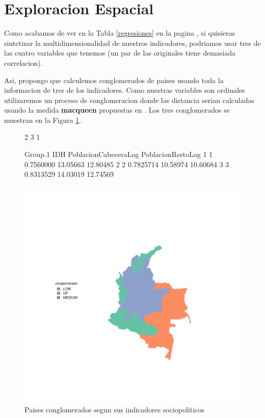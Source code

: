 \documentclass{article}
\begin{document}
\clearpage


\section{Exploracion Espacial}

Como acabamos de ver en la Tabla \ref{regresiones} en la pagina \pageref{regresiones}, si quisieras sintetizar la multidimensionalidad de nuestros indicadores, podriamos usar tres de las cuatro variables que tenemos (un par de las originales tiene demasiada correlacion). 

Asi, propongo que calculemos conglomerados de paises usando toda la informacion de tres de los indicadores. Como nuestras variables son ordinales utilizaremos un proceso de conglomeracion donde las distancia serian calculadas usando la medida {\bf macqueen} propuestas en . Los tres conglomerados se muestran en la Figura \ref{clustmap}.




\begin{figure}[h]
\centering
\begin{Schunk}
\begin{Soutput}
[1] 2 3 1
\end{Soutput}
\begin{Soutput}
  Group.1       IDH PoblacionCabeceraLog PoblacionRestoLog
1       1 0.7560000             13.05663          12.80485
2       2 0.7825714             10.58974          10.60684
3       3 0.8313529             14.03019          12.74569
\end{Soutput}
\end{Schunk}
\includegraphics{Proyecto-plotMap1}
\caption{Paises conglomerados segun sus indicadores sociopoliticos}\label{clustmap}
\end{figure}

%
%
\end{document}

